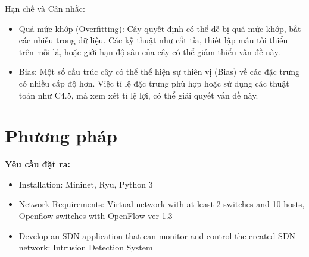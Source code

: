 \documentclass[a4paper]{article}
\begin{document}
Hạn chế và Cân nhắc:
\begin{itemize}
    \item Quá mức khớp (Overfitting): Cây quyết định có thể dễ bị quá mức khớp, bắt các nhiễu trong dữ liệu. Các kỹ thuật như cắt tỉa, thiết lập mẫu tối thiểu trên mỗi lá, hoặc giới hạn độ sâu của cây có thể giảm thiểu vấn đề này.
    \item Bias: Một số cấu trúc cây có thể thể hiện sự thiên vị (Bias) về các đặc trưng có nhiều cấp độ hơn. Việc tỉ lệ đặc trưng phù hợp hoặc sử dụng các thuật toán như C4.5, mà xem xét tỉ lệ lợi, có thể giải quyết vấn đề này.
\end{itemize}


\newpage
\section{Phương pháp}
\textbf{Yêu cầu đặt ra: }
\begin{itemize}
    \item Installation: Mininet, Ryu, Python 3
    \item Network Requirements: Virtual network with at least 2 switches and 10 hosts, Openflow
    switches with OpenFlow ver 1.3
    \item Develop an SDN application that can monitor and control the created SDN network: Intrusion Detection System
\end{itemize}
\end{document}
